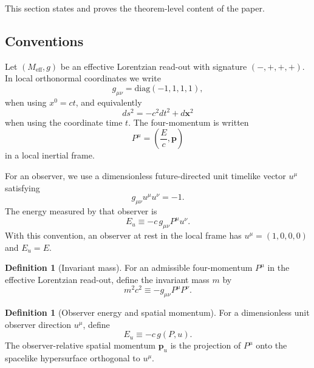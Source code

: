\documentclass[12pt,a4paper]{article}
\theoremstyle{definition}
\newtheorem{definition}[theorem]{Definition}
\theoremstyle{remark}
\newcommand{\Meff}{M_{\mathrm{eff}}}
\begin{document}
This section states and proves the theorem-level content of the paper.

\subsection{Conventions}

Let $(\Meff,g)$ be an effective Lorentzian read-out with signature $(-,+,+,+)$. In local orthonormal coordinates we write
\begin{equation}
g_{\mu\nu}=\mathrm{diag}(-1,1,1,1),
\end{equation}
when using $x^0=ct$, and equivalently
\begin{equation}
ds^2=-c^2dt^2+d\mathbf{x}^2
\end{equation}
when using the coordinate time $t$. The four-momentum is written
\begin{equation}
P^\mu=\left(\frac{E}{c},\mathbf p\right)
\end{equation}
in a local inertial frame.

For an observer, we use a dimensionless future-directed unit timelike vector $u^\mu$ satisfying
\begin{equation}
g_{\mu\nu}u^\mu u^\nu=-1.
\end{equation}
The energy measured by that observer is
\begin{equation}
E_u \equiv -c\,g_{\mu\nu}P^\mu u^\nu .
\end{equation}
With this convention, an observer at rest in the local frame has $u^\mu=(1,0,0,0)$ and $E_u=E$.

\begin{definition}[Invariant mass]
\label{def:mass}
For an admissible four-momentum $P^\mu$ in the effective Lorentzian read-out, define the invariant mass $m$ by
\begin{equation}
m^2c^2 \equiv -g_{\mu\nu}P^\mu P^\nu .
\end{equation}
\end{definition}

\begin{definition}[Observer energy and spatial momentum]
\label{def:observer-energy}
For a dimensionless unit observer direction $u^\mu$, define
\begin{equation}
E_u \equiv -c\,g(P,u).
\end{equation}
The observer-relative spatial momentum $\mathbf p_u$ is the projection of $P^\mu$ onto the spacelike hypersurface orthogonal to $u^\mu$.
\end{definition}
\end{document}
